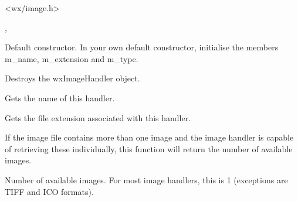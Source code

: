


<wx/image.h>


,



\label{wximagehandlerctor}


Default constructor. In your own default constructor, initialise the members
m\_name, m\_extension and m\_type.


\label{wximagehandlerdtor}


Destroys the wxImageHandler object.


\label{wximagehandlergetname}


Gets the name of this handler.


\label{wximagehandlergetextension}


Gets the file extension associated with this handler.


\label{wximagehandlergetimagecount}


If the image file contains more than one image and the image handler is capable
of retrieving these individually, this function will return the number of
available images.



Number of available images. For most image handlers, this is 1 (exceptions
are TIFF and ICO formats).


\label{wximagehandlergettype}

